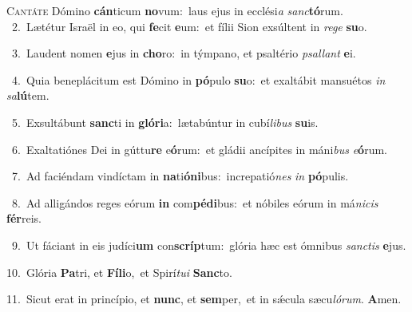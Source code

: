 \lettrine{\initial\textcolor{\initialcolor}{C}}{antáte} Dómino \textbf{cán}\-ticum \textbf{no}\-vum:~\star laus ejus in ecclési\textit{a} \textit{sanc}\-\textbf{tó}rum.\\
{\numbfont\textcolor{\numbcolor}{~2.}}~Lætétur Israël in eo, qui \textbf{fe}\-cit \textbf{e}\-um:~\star et fílii Sion exsúltent in \textit{re}\-\textit{ge} \textbf{su}\-o.\par
{\numbfont\textcolor{\numbcolor}{~3.}}~Laudent nomen \textbf{e}\-jus in \textbf{cho}\-ro:~\star in týmpano, et psaltério \textit{psal}\-\textit{lant} \textbf{e}\-i.\par
{\numbfont\textcolor{\numbcolor}{~4.}}~Quia beneplácitum est Dómino in \textbf{pó}\-pulo \textbf{su}\-o:~\star et exaltábit mansuétos \textit{in} \textit{sa}\-\textbf{lú}tem.\par
{\numbfont\textcolor{\numbcolor}{~5.}}~Exsultábunt \textbf{sanc}\-ti in \textbf{gló}\-\textbf{ri}a:~\star lætabúntur in cubí\-\textit{li}\-\textit{bus} \textbf{su}\-is.\par
{\numbfont\textcolor{\numbcolor}{~6.}}~Exaltatiónes Dei in gúttu\textbf{re} e\-\textbf{ó}\-rum:~\star et gládii ancípites in máni\textit{bus} \textit{e}\-\textbf{ó}rum.\par
{\numbfont\textcolor{\numbcolor}{~7.}}~Ad faciéndam vindíctam in \textbf{na}\-ti\-\textbf{ó}\-\textbf{ni}bus:~\star increpatió\textit{nes} \textit{in} \textbf{pó}\-pulis.\par
{\numbfont\textcolor{\numbcolor}{~8.}}~Ad alligándos reges eórum \textbf{in} com\-\textbf{pé}\-\textbf{di}bus:~\star et nóbiles eórum in má\-\textit{ni}\-\textit{cis} \textbf{fér}\-reis.\par
{\numbfont\textcolor{\numbcolor}{~9.}}~Ut fáciant in eis judíci\textbf{um} con\-\textbf{scríp}\-tum:~\star glória hæc est ómnibus \textit{sanc}\-\textit{tis} \textbf{e}\-jus.\par
{\numbfont\textcolor{\numbcolor}{10.}}~Glória \textbf{Pa}\-tri, et \textbf{Fí}\-\textbf{li}o,~\star et Spirí\-\textit{tu}\-\textit{i} \textbf{Sanc}\-to.\par
{\numbfont\textcolor{\numbcolor}{11.}}~Sicut erat in princípio, et \textbf{nunc}\-, et \textbf{sem}\-per,~\star et in sǽcula sæcu\-\textit{ló}\-\textit{rum}. \textbf{A}\-men.\par
